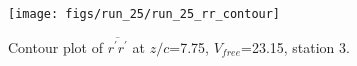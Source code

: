 \begin{figure}[H]
\centering
\texttt{[image: figs/run\_25/run\_25\_rr\_contour]}
\caption{Contour plot of $\overline{r^\prime r^\prime}$ at $z/c$=7.75, $V_{free}$=23.15, station 3.}
\label{fig:run_25_rr_contour}
\end{figure}


